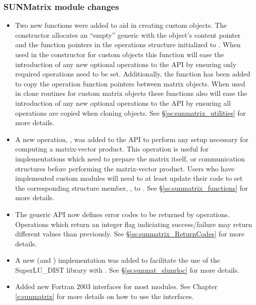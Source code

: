 \subsubsection*{SUNMatrix module changes}

\begin{itemize}
\item Two new functions were added to aid in creating custom {\sunmatrix} objects. The
constructor  allocates an ``empty'' generic {\sunmatrix} with
the object's content pointer and the function pointers in the operations
structure initialized to . When used in the constructor for custom
objects this function will ease the introduction of any new optional operations
to the {\sunmatrix} API by ensuring only required operations need to be set.
Additionally, the function  has been added to copy the
operation function pointers between matrix objects. When used in clone routines
for custom matrix objects these functions also will ease the introduction of any
new optional operations to the {\sunmatrix} API by ensuring all operations are
copied when cloning objects. See \S\ref{ss:sunmatrix_utilities} for more details.
%
\item A new operation, , was added to the {\sunmatrix} API
to perform any setup necessary for computing a matrix-vector product. This
operation is useful for {\sunmatrix} implementations which need to prepare the
matrix itself, or communication structures before performing the matrix-vector
product. Users who have implemented custom {\sunmatrix} modules will need to at
least update their code to set the corresponding  structure member,
, to . See \S\ref{ss:sunmatrix_functions} for more
details.
%
\item The generic {\sunmatrix} API now defines error codes to be returned by
{\sunmatrix} operations. Operations which return an integer flag indiciating
success/failure may return different values than previously. See
\S\ref{ss:sunmatrix_ReturnCodes} for more details.
%
\item A new {\sunmatrix} (and {\sunlinsol}) implementation was added to
facilitate the use of the SuperLU\_DIST library with {\sundials}. See
\S\ref{ss:sunmat_slunrloc} for more details.
%
\item Added new Fortran 2003 interfaces for most {\sunmatrix} modules. See Chapter
\ref{s:sunmatrix} for more details on how to use the interfaces.
\end{itemize}

